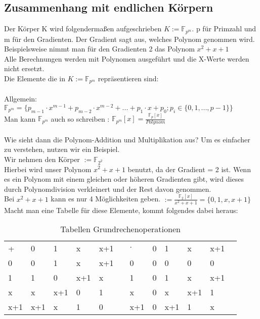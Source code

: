 \subsection{Zusammenhang mit endlichen Körpern}

Der Körper K wird folgendermaßen aufgeschrieben $ K := \mathbb{F}_{p^m}$. p für Primzahl und m für den Gradienten. Der Gradient sagt aus, welches Polynom genommen wird. 
Beispielsweise nimmt man für den Gradienten 2 das Polynom $x^2 + x + 1$\\
Alle Berechnungen werden mit Polynomen ausgeführt und die X-Werte werden nicht ersetzt.
\\
Die Elemente die in $ K := \mathbb{F}_{p^m}$ repräsentieren sind:\\
\\
Allgemein: $  \mathbb{F}_{p^m} = \{p_{m-1} \cdot x^{m-1} + p_{m-2} \cdot x^{m-2} + ... + p_1 \cdot x + p_0 ; p_i \in \{0,1,..., p-1\} \}$\\
Man kann $\mathbb{F}_{p^m}$ auch so schreiben : $\mathbb{F}_{p^m}[x] = \frac{\mathbb{F}_{p}[x]}{Polynom} $\\
\\
Wie sieht dann die Polynom-Addition und Multiplikation aus? Um es einfacher zu verstehen, nutzen wir ein Beispiel.
\\
Wir nehmen den Körper $ := \mathbb{F}_{2^2}$
\\
Hierbei wird unser Polynom $ x^2+ x + 1 $ benutzt, da der Gradient = 2 ist. Wenn es ein Polynom mit einem gleichen oder höheren Gradienten gibt, wird dieses durch Polynomdivision verkleinert und der Rest davon genommen.\\
Bei $ x^2+ x + 1 $ kann es nur 4 Möglichkeiten geben. $ := \frac{\mathbb{F}_{2}[x]}{x^2+ x + 1} = \{0, 1, x, x+1\}$\\

Macht man eine Tabelle für diese Elemente, kommt folgendes dabei heraus:

\begin{table}[h]\caption{Tabellen Grundrechenoperationen}
    \begin{tabular}{l|l|l|l|lll|l|l|l|ll}
    +   & 0   & 1   & x   & x+1 &  & $\cdot$   & 0 & 1   & x   & x+1 &  \\ \cline{1-5} \cline{7-11}
    0   & 0   & 1   & x   & x+1 &  & 0   & 0 & 0   & 0   & 0   &  \\ \cline{1-5} \cline{7-11}
    1   & 1   & 0   & x+1 & x   &  & 1   & 0 & 1   & x   & x+1 &  \\ \cline{1-5} \cline{7-11}
    x   & x   & x+1 & 0   & 1   &  & x   & 0 & x   & x+1 & 1   &  \\ \cline{1-5} \cline{7-11}
    x+1 & x+1 & x   & 1   & 0   &  & x+1 & 0 & x+1 & 1   & x   & 
    \end{tabular}
\end{table}

